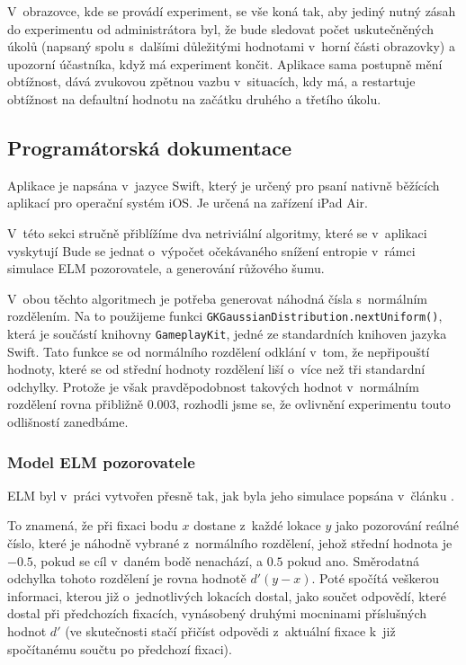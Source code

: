 \bigskip
V~obrazovce, kde se provádí experiment, se vše koná tak, aby jediný nutný zásah
do experimentu od administrátora byl, že bude sledovat počet uskutečněných
úkolů (napsaný spolu s~dalšími důležitými hodnotami v~horní části obrazovky) a
upozorní účastníka, když má experiment končit. Aplikace sama postupně mění
obtížnost, dává zvukovou zpětnou vazbu v~situacích, kdy má, a restartuje
obtížnost na defaultní hodnotu na začátku druhého a třetího úkolu.

\subsection*{Programátorská dokumentace}

Aplikace je napsána v~jazyce Swift, který je určený pro psaní nativně běžících
aplikací pro operační systém iOS. Je určená na zařízení iPad Air.

V~této sekci stručně přiblížíme dva netriviální algoritmy, které se v~aplikaci
vyskytují Bude se jednat o~výpočet očekávaného snížení entropie v~rámci
simulace ELM pozorovatele, a generování růžového šumu.

V~obou těchto algoritmech je potřeba generovat náhodná čísla s~normálním
rozdělením. Na to použijeme funkci {\tt GKGaussianDistribution.nextUniform()},
která je součástí knihovny {\tt GameplayKit}, jedné ze standardních knihoven
jazyka Swift. Tato funkce se od normálního rozdělení odklání v~tom, že
nepřipouští hodnoty, které se od střední hodnoty rozdělení liší o~více než tři
standardní odchylky. Protože je však pravděpodobnost takových hodnot
v~normálním rozdělení rovna přibližně $0.003$, rozhodli jsme se, že ovlivnění
experimentu touto odlišností zanedbáme.

\subsubsection*{Model ELM pozorovatele}

ELM  byl v~práci vytvořen přesně tak, jak byla jeho simulace popsána v~článku \citep{Najemnik09}. 

To znamená, že při fixaci bodu $x$  dostane z~každé lokace $y$ jako pozorování reálné
číslo, které je náhodně vybrané z~normálního rozdělení, jehož střední hodnota
je $-0.5$, pokud se cíl v~daném bodě nenachází, a $0.5$ pokud ano. Směrodatná
odchylka tohoto rozdělení je rovna hodnotě $d'(y-x)$. Poté
spočítá veškerou informaci, kterou již o~jednotlivých lokacích dostal, jako
součet odpovědí, které dostal při předchozích fixacích, vynásobený druhými
mocninami příslušných hodnot $d'$ (ve skutečnosti stačí přičíst odpovědi
z~aktuální fixace k~již spočítanému součtu po předchozí fixaci).

